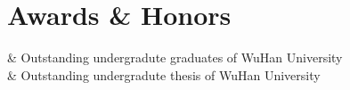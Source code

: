 \section{Awards \& Honors}

\begin{EntriesTable}
    &
    Outstanding undergradute graduates of WuHan University
  \\
    &
    Outstanding undergradute thesis of WuHan University
\end{EntriesTable}
